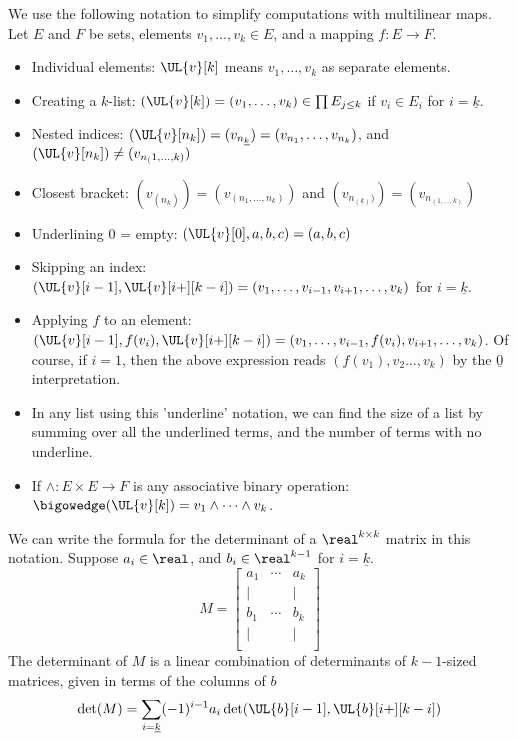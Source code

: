 \documentclass[../main-v2-manifolds.tex]{subfiles}
\begin{document}
We use the following notation to simplify computations with multilinear maps. Let $E$ and $F$ be sets, elements $v_1,\ldots, v_k\in E$, and a mapping $f: E\to F$.
\begin{itemize}
    \item Individual elements: $\UL{v}[k]$ means $v_1,\ldots,v_k$ as separate elements. 
    \item Creating a $k$-list: $(\UL{v}[k]) = (v_1,\ldots, v_k)\in \prod E_{j\leq k}$ if $v_i\in E_i$ for $i = \underline{k}$.
    \item Nested indices: $(\UL{v}[n_k]) = (v_{n_{\underline{k}}}) = (v_{n_1},\ldots, v_{n_k})$, and $(\UL{v}[n_k]) \neq (v_{n_(1,\ldots,k)})$
    \item Closest bracket: $(v_{(n_{\underline{k}})}) = (v_{(n_1, \ldots, n_k)})$ and $(v_{n_{(\underline{k})})}) = (v_{n_{(1, \ldots, k)}})$
    \item Underlining $0$ = empty: $(\UL{v}[0], a,b,c) = (a,b,c)$
    \item Skipping an index: $(\UL{v}[i-1],\UL{v}[i+][k-i]) = (v_{1},\ldots, v_{i-1},v_{i+1},\ldots, v_{k})$ for $i = \underline{k}$.
    \item Applying $f$ to an element: $(\UL{v}[i-1], f(v_{i}), \UL{v}[i+][k-i]) = (v_1,\ldots, v_{i-1}, f(v_i), v_{i+1}, \ldots, v_k)$. Of course, if $i=1$, then the above expression reads $(f(v_1), v_2\ldots, v_k)$ by the $\underline{0}$ interpretation.
    \item In any list using this 'underline' notation, we can find the size of a list by summing over all the underlined terms, and the number of terms with no underline.
    \item If $\wedge: E\times E\to F$ is any associative binary operation: $\bigowedge(\UL{v}[k]) = v_1\wedge\cdots \wedge v_k$.
\end{itemize}
\begin{example}\label{rmk:preview of exterior calculus}
We can write the formula for the determinant of a $\real^{k\times k}$ matrix in this notation. Suppose $a_i\in\real$, and $b_i\in\real^{k-1}$ for $i=\underline{k}$.
\[
M = \begin{bmatrix}
    a_1 & \cdots & a_k \\[1ex]
    \vert &  & \vert \\
    b_1 & \cdots & b_k \\
    \vert &  & \vert \\[1ex]
\end{bmatrix}
\]
The determinant of $M$ is a linear combination of determinants of $k-1$-sized matrices, given in terms of the columns of $b$
\[
    \det(M) = \sum_{i=\underline{k}}(-1)^{i-1} a_i\det(\UL{b}[i-1],\UL{b}[i+][k-i])
\]    
\end{example}
    
\end{document}

